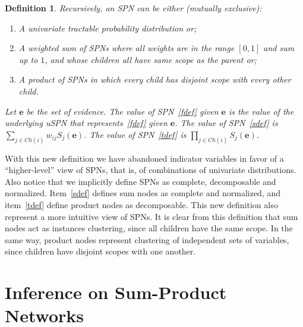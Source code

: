 \documentclass{amsart}
\theoremstyle{plain}
\newcounter{dummy-def}\numberwithin{dummy-def}{section}
\newtheorem{definition}[dummy-def]{Definition}
\newcounter{dummy-thm}\numberwithin{dummy-thm}{section}
\newcounter{dummy-prop}\numberwithin{dummy-prop}{section}
\newcounter{dummy-corollary}\numberwithin{dummy-corollary}{section}
\newcounter{dummy-ex}\numberwithin{dummy-ex}{section}
\newcounter{dummy-eg}\numberwithin{dummy-eg}{section}
\numberwithin{equation}{section}
\begin{document}
\begin{definition}
  Recursively, an SPN can be either (mutually exclusive):
  \begin{enumerate}[label=(\arabic*)]
    \item \label{fdef} A univariate tractable probability distribution or;
    \item \label{sdef} A weighted sum of SPNs where all weights are in the range $[0,1]$ and sum up
      to $1$, and whose children all have same scope as the parent or;\label{sdef}
    \item \label{tdef} A product of SPNs in which every child has disjoint scope with every other
      child.
  \end{enumerate}
  Let $\mathbf{e}$ be the set of evidence. The value of SPN~\ref{fdef} given $\mathbf{e}$ is the
  value of the underlying uSPN that represents~\ref{fdef} given $\mathbf{e}$. The value of
  SPN~\ref{sdef} is $\sum_{j\in Ch(i)}w_{ij}S_j(\mathbf{e})$. The value of SPN~\ref{tdef} is
  $\prod_{j\in Ch(i)}S_j(\mathbf{e})$.
\end{definition}

With this new definition we have abandoned indicator variables in favor of a ``higher-level'' view
of SPNs, that is, of combinations of univariate distributions. Also notice that we implicitly
define SPNs as complete, decomposable and normalized. Item~\ref{sdef} defines sum nodes as complete
and normalized, and item~\ref{tdef} define product nodes as decomposable. This new definition also
represent a more intuitive view of SPNs. It is clear from this definition that sum nodes act as
instances clustering, since all children have the same scope. In the same way, product nodes
represent clustering of independent sets of variables, since children have disjoint scopes with
one another.

\section{Inference on Sum-Product Networks}




\newpage
\appendix

\newpage

\printbibliography[]
\end{document}
